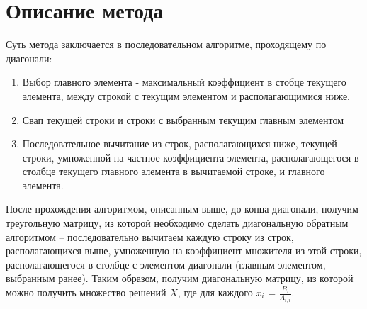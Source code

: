\thispagestyle{empty}
\BgThispage


\section{Описание метода} \par
Суть метода заключается в последовательном алгоритме, проходящему по диагонали:
\begin{enumerate}
    \item Выбор главного элемента - максимальный коэффициент в стобце текущего элемента, между строкой с текущим элементом и располагающимися ниже.
    \item Свап текущей строки и строки с выбранным текущим главным элементом
    \item Последовательное вычитание из строк, располагающихся ниже, текущей строки, умноженной на частное коэффициента элемента, располагающегося в столбце текущего главного элемента в вычитаемой строке, и главного элемента.
\end{enumerate}
После прохождения алгоритмом, описанным выше, до конца диагонали, получим треугольную матрицу, из которой необходимо сделать диагональную обратным алгоритмом -- последовательно вычитаем каждую строку из строк, располагающихся выше, умноженную на коэффициент множителя из этой строки, располагающегося в столбце с элементом диагонали (главным элементом, выбранным ранее).
Таким образом, получим диагональную матрицу, из которой можно получить множество решений $X$, где для каждого $x_{i}$ = $\frac{B_{i}}{A_{i,i}}$.
\newpage
\thispagestyle{empty}
\BgThispage


